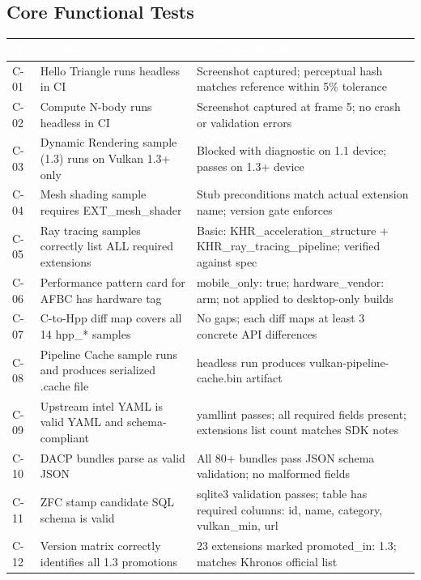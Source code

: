 \documentclass[11pt,letterpaper]{article}
\newcommand{\tableheader}[1]{\textbf{\sffamily\textcolor{white}{#1}}}
\begin{document}
\subsection{Core Functional Tests}

\begin{center}
\begin{tabularx}{\textwidth}{C{1cm}L{4.5cm}X}
\toprule
{}
\tableheader{ID} & \tableheader{Verifies} & \tableheader{Expected Result} \\
\midrule
C-01 & Hello Triangle runs headless in CI & Screenshot captured; perceptual hash matches reference within 5\% tolerance \\
C-02 & Compute N-body runs headless in CI & Screenshot captured at frame 5; no crash or validation errors \\
C-03 & Dynamic Rendering sample (1.3) runs on Vulkan 1.3+ only & Blocked with diagnostic on 1.1 device; passes on 1.3+ device \\
C-04 & Mesh shading sample requires EXT\_mesh\_shader & Stub preconditions match actual extension name; version gate enforces \\
C-05 & Ray tracing samples correctly list ALL required extensions & Basic: KHR\_acceleration\_structure + KHR\_ray\_tracing\_pipeline; verified against spec \\
C-06 & Performance pattern card for AFBC has hardware tag & mobile\_only: true; hardware\_vendor: arm; not applied to desktop-only builds \\
C-07 & C-to-Hpp diff map covers all 14 hpp\_* samples & No gaps; each diff maps at least 3 concrete API differences \\
C-08 & Pipeline Cache sample runs and produces serialized .cache file & headless run produces vulkan-pipeline-cache.bin artifact \\
C-09 & Upstream intel YAML is valid YAML and schema-compliant & yamllint passes; all required fields present; extensions list count matches SDK notes \\
C-10 & DACP bundles parse as valid JSON & All 80+ bundles pass JSON schema validation; no malformed fields \\
C-11 & ZFC stamp candidate SQL schema is valid & sqlite3 validation passes; table has required columns: id, name, category, vulkan\_min, url \\
C-12 & Version matrix correctly identifies all 1.3 promotions & 23 extensions marked promoted\_in: 1.3; matches Khronos official list \\
\bottomrule
\end{tabularx}
\end{center}
\end{document}
